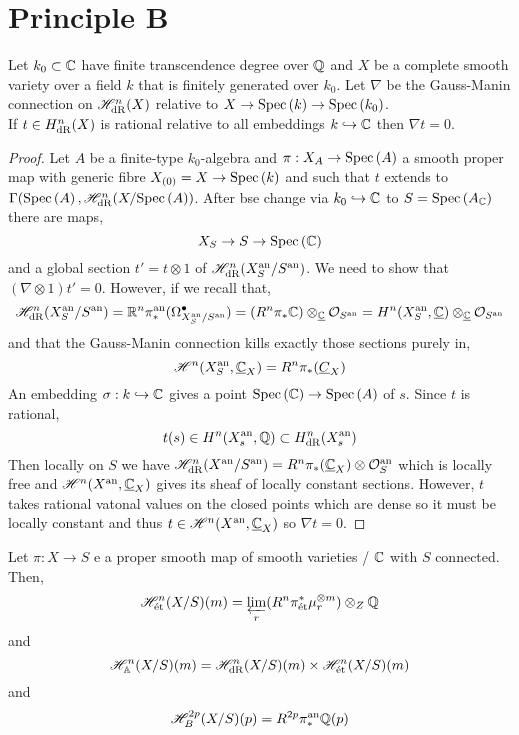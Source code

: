 \documentclass[12pt]{article}
\begin{document}
\section{Principle B}

\newcommand{\fin}{\mathrm{fin}}

\begin{proposition}
Let $k_0 \subset \mathbb{C}$ have finite transcendence degree over $\mathbb{Q}$ and $X$ be a complete smooth variety over a field $k$ that is finitely generated over $k_0$. Let $\nabla$ be the Gauss-Manin connection on $\mathscr{H}^n_{\mathrm{dR}}(X)$ relative to $X \to \mathrm{Spec}\left( k \right) \to \mathrm{Spec}\left( k_0 \right)$.
\bigskip\\
If $t \in H^n_{\mathrm{dR}}(X)$ is rational relative to all embeddings $k \hookrightarrow  \mathbb{C}$ then $\nabla t = 0$. 
\end{proposition}

\begin{proof}
Let $A$ be a finite-type $k_0$-algebra and $\pi : X_A \to \mathrm{Spec}\left( A \right)$ a smooth proper map with generic fibre $X_{(0)} = X \to \mathrm{Spec}\left( k \right)$ and such that $t$ extends to $\Gamma(\mathrm{Spec}\left( A \right), \mathscr{H}^n_{\mathrm{dR}}(X / \mathrm{Spec}\left( A \right))$. After bse change via $k_0 \hookrightarrow \mathbb{C}$ to $S = \mathrm{Spec}\left( A_{\mathbb{C}} \right)$ there are maps,
\[ X_S \to S \to \mathrm{Spec}\left( \mathbb{C} \right) \]
and a global section $t' = t \otimes 1$ of $\mathscr{H}^n_{\mathrm{dR}}(X_S^{\mathrm{an}} / S^{\mathrm{an}})$. We need to show that $(\nabla \otimes 1) t' = 0$. However, if we recall that,
\[ \mathscr{H}^n_{\mathrm{dR}}(X_S^{\mathrm{an}} / S^{\mathrm{an}}) = \mathbb{R}^n \pi_*^{\mathrm{an}} (\Omega^\bullet_{X_S^{\mathrm{an}} / S^{\mathrm{an}}}) = (R^n \pi_* \mathbb{C}) \otimes_{\underline{\mathbb{C}}} \mathcal{O}_{S^{\mathrm{an}}} = H^n(X^{\mathrm{an}}_S, \underline{\mathbb{C}}) \otimes_{\underline{\mathbb{C}}} \mathcal{O}_{S^{\mathrm{an}}} \]
and that the Gauss-Manin connection kills exactly those sections purely in,
\[ \mathscr{H}^n(X^{\mathrm{an}}_S, \underline{\mathbb{C}}_X) = R^n \pi_* (\underline{C}_X) \]
An embedding $\sigma : k \hookrightarrow \mathbb{C}$ gives a point $\mathrm{Spec}\left( \mathbb{C} \right) \to \mathrm{Spec}\left( A \right)$ of $s$. Since $t$ is rational,
\[ t(s) \in H^n(X^{\mathrm{an}}_s, \mathbb{Q}) \subset H^n_{\mathrm{dR}}(X^{\mathrm{an}}_s) \]
Then locally on $S$ we have $\mathscr{H}^n_{\mathrm{dR}}(X^{\mathrm{an}} / S^{\mathrm{an}}) = R^n \pi_*(\underline{\mathbb{C}}_X) \otimes \mathcal{O}_{S}^{\mathrm{an}}$ which is locally free and $\mathscr{H}^n(X^{\mathrm{an}}, \underline{\mathbb{C}}_X)$ gives its sheaf of locally constant sections. However, $t$ takes rational vatonal values on the closed points which are dense so it must be locally constant and thus $t \in \mathscr{H}^n(X^{\mathrm{an}}, \underline{\mathbb{C}}_X)$ so $\nabla t = 0$.
\end{proof}

\begin{definition}
Let $\pi : X \to S$ e a proper smooth map of smooth varieties / $\mathbb{C}$ with $S$ connected. Then,
\[ \mathscr{H}^n_{\text{\'{e}t}}(X/S)(m) = \varprojlim_r (R^n \pi^*_{\text{\'{e}t}} \mu_r^{\otimes m} ) \otimes_Z \mathbb{Q} \]
and
\[ \mathscr{H}^n_{\mathbb{A}}(X/S)(m) = \mathscr{H}^n_{\mathrm{dR}}(X/S)(m) \times \mathscr{H}^n_{\text{\'{e}t}}(X/S)(m) \]
and
\[ \mathscr{H}_B^{2 p}(X/S)(p) = R^{2p} \pi_*^{\mathrm{an}} \mathbb{Q}(p) \]
\end{definition}
\end{document}
